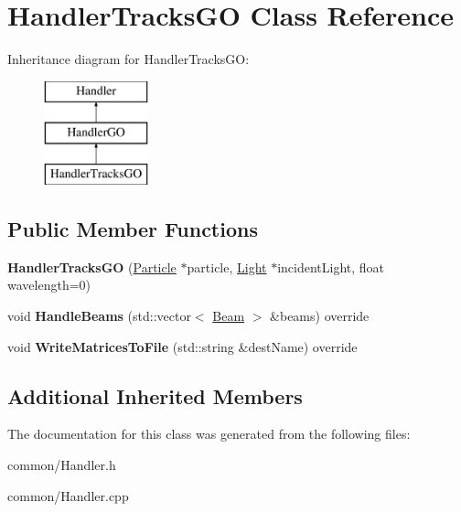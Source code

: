 \hypertarget{class_handler_tracks_g_o}{}\section{Handler\+Tracks\+GO Class Reference}
\label{class_handler_tracks_g_o}
Inheritance diagram for Handler\+Tracks\+GO\+:\begin{figure}[H]
\begin{center}
\leavevmode
\includegraphics[height=3.000000cm]{class_handler_tracks_g_o}
\end{center}
\end{figure}
\subsection*{Public Member Functions}
\begin{DoxyCompactItemize}
\item 
\mbox{\label{class_handler_tracks_g_o_a991b2082b340c3951e8a07dcca7faac7}} 
{\bfseries Handler\+Tracks\+GO} (\mbox{\hyperlink{class_particle}{Particle}} $\ast$particle, \mbox{\hyperlink{class_light}{Light}} $\ast$incident\+Light, float wavelength=0)
\item 
\mbox{\label{class_handler_tracks_g_o_a0968818f112c86548db0f841667dde4f}} 
void {\bfseries Handle\+Beams} (std\+::vector$<$ \mbox{\hyperlink{class_beam}{Beam}} $>$ \&beams) override
\item 
\mbox{\label{class_handler_tracks_g_o_a7a14a10b0d8b54039cf2c9000b0f1d51}} 
void {\bfseries Write\+Matrices\+To\+File} (std\+::string \&dest\+Name) override
\end{DoxyCompactItemize}
\subsection*{Additional Inherited Members}


The documentation for this class was generated from the following files\+:\begin{DoxyCompactItemize}
\item 
common/Handler.\+h\item 
common/Handler.\+cpp\end{DoxyCompactItemize}
